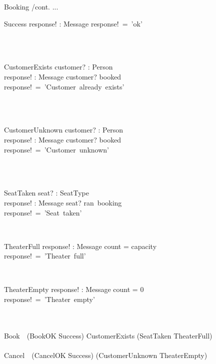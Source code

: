 \documentclass[12pt]{article}
\begin{document}
\begin{class}{Booking /cont.}
...\\
\begin{op}{Success}
response! : Message
\where
response!~=~'ok'\\
\end{op}\\
\ \\
\begin{op}{CustomerExists}
customer? : Person\\
response! : Message
\ST
customer? \in booked\\
response!~=~'Customer~already~exists'
\end{op}\\
\ \\
\begin{op}{CustomerUnknown}
customer? : Person\\
response! : Message
\ST
customer? \notin booked\\
response!~=~'Customer~unknown'
\end{op}\\
\ \\
\begin{op}{SeatTaken}
seat? : SeatType\\
response! : Message
\ST
seat? \in ran~booking\\
response!~=~'Seat~taken'
\end{op}\\
\begin{op}{TheaterFull}
response! : Message
\ST
count = capacity\\
response!~=~'Theater~full'
\end{op}\\
\begin{op}{TheaterEmpty}
response! : Message
\ST
count = 0\\
response!~=~'Theater~empty'
\end{op}\\
\ \\
Book~\hat{=}~(BookOK \wedge Success) \oplus CustomerExists
		\oplus (SeatTaken \vee TheaterFull)\\
\ \\
Cancel~\hat{=}~(CancelOK \wedge Success) \oplus 
	(CustomerUnknown \vee TheaterEmpty)\\
\end{class}
\end{document}
